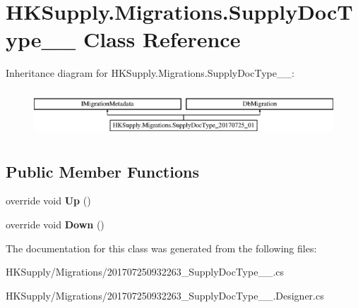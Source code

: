 \hypertarget{class_h_k_supply_1_1_migrations_1_1_supply_doc_type__20170725__01}{}\section{H\+K\+Supply.\+Migrations.\+Supply\+Doc\+Type\+\_\+\_ Class Reference}
\label{class_h_k_supply_1_1_migrations_1_1_supply_doc_type__20170725__01}
Inheritance diagram for H\+K\+Supply.\+Migrations.\+Supply\+Doc\+Type\+\_\+\_\+:\begin{figure}[H]
\begin{center}
\leavevmode
\includegraphics[height=1.766562cm]{class_h_k_supply_1_1_migrations_1_1_supply_doc_type__20170725__01}
\end{center}
\end{figure}
\subsection*{Public Member Functions}
\begin{DoxyCompactItemize}
\item 
\mbox{\label{class_h_k_supply_1_1_migrations_1_1_supply_doc_type__20170725__01_a2b10429ae70774915f1d41297d2d56a8}} 
override void {\bfseries Up} ()
\item 
\mbox{\label{class_h_k_supply_1_1_migrations_1_1_supply_doc_type__20170725__01_a47fd7a39ca0a7f5235a1662351489441}} 
override void {\bfseries Down} ()
\end{DoxyCompactItemize}


The documentation for this class was generated from the following files\+:\begin{DoxyCompactItemize}
\item 
H\+K\+Supply/\+Migrations/201707250932263\+\_\+\+Supply\+Doc\+Type\+\_\+\_.\+cs\item 
H\+K\+Supply/\+Migrations/201707250932263\+\_\+\+Supply\+Doc\+Type\+\_\+\_.\+Designer.\+cs\end{DoxyCompactItemize}
